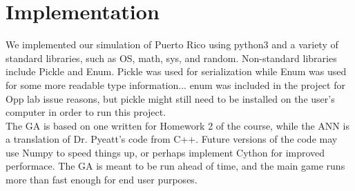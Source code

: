 
\chapter{Implementation}

We implemented our simulation of Puerto Rico using python3 and a variety of standard libraries, such as OS, math, sys, and random.  Non-standard libraries include Pickle and Enum.  Pickle was used for serialization while Enum was used for some more readable type information... enum was included in the project for Opp lab issue reasons, but pickle might still need to be installed on the user's computer in order to run this project. \\

The GA is based on one written for Homework 2 of the course, while the ANN is a translation of Dr. Pyeatt's code from C++.  Future versions of the code may use Numpy to speed things up, or perhaps implement Cython for improved performace.  The GA is meant to be run ahead of time, and the main game runs more than fast enough for end user purposes.